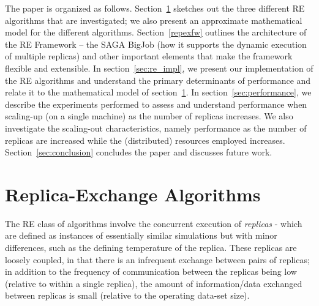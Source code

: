 \documentclass{rspublic}
\newcommand{\jhanote}[1]{ {\textcolor{red} { ***shantenu: #1 }}}
\newcommand{\alnote}[1]{ {\textcolor{blue} { ***andre: #1 }}}
\newcommand{\athotanote}[1]{ {\textcolor{green} { ***athota: #1 }}}
\newcommand{\alnote}[1]{}
\newcommand{\athotanote}[1]{}
\newcommand{\jhanote}[1]{}
\begin{document}
The paper is organized as follows. Section~\ref{sec:repex-approach}
sketches out the three different RE algorithms that are investigated; 
we also present an approximate mathematical model for the different algorithms.  
Section~\ref{repexfw} outlines the architecture of the RE Framework -- the SAGA BigJob
(how it supports the dynamic execution of multiple replicas) and other
important elements that make the framework flexible and extensible.
In section~\ref{sec:re_impl}, we present our implementation of the RE algorithms and
understand the primary determinants of performance and relate it to
the mathematical model of section~\ref{sec:repex-approach}.  
In section~\ref{sec:performance}, we describe the experiments performed 
to assess and understand performance when scaling-up (on a single machine) 
as the number of replicas increases. We also investigate the scaling-out
characteristics, namely performance as the number of replicas are
increased while the (distributed) resources employed
increases. %
Section~\ref{sec:conclusion} concludes the paper and discusses future work.


\section{Replica-Exchange Algorithms}\label{sec:repex-approach}

The RE class of algorithms involve the concurrent execution of
\emph{replicas} - which are defined as instances of essentially
similar simulations but with minor differences, such as the defining
temperature of the replica. These replicas are loosely coupled, in
that there is an infrequent exchange between pairs of 
replicas; in addition to the frequency of communication between the
replicas being low (relative to within a single replica), the amount
of information/data exchanged between replicas is small (relative to
the operating data-set size).

\end{document}
